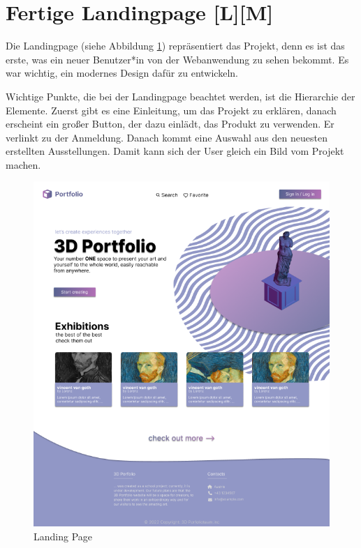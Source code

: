 \section{Fertige Landingpage [L][M]}
Die Landingpage (siehe Abbildung \ref{fig:impl:finishedLandingpage}) repräsentiert das Projekt, denn es ist das erste, was ein neuer Benutzer*in von der Webanwendung zu sehen bekommt. Es war wichtig, ein modernes Design dafür zu entwickeln.

Wichtige Punkte, die bei der Landingpage beachtet werden, ist die Hierarchie der Elemente. Zuerst gibt es eine Einleitung, um das Projekt zu erklären, danach erscheint ein großer Button, der dazu einlädt, das Produkt zu verwenden. Er verlinkt zu der Anmeldung. Danach kommt eine Auswahl aus den neuesten erstellten Ausstellungen. Damit kann sich der User gleich ein Bild vom Projekt machen.

\begin{figure}[h t]
    \centering
    \includegraphics[scale=.5]{pics/startingpage.png}
    \caption{Landing Page}
    \label{fig:impl:finishedLandingpage}
\end{figure}

